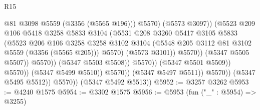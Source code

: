 \begin{lexlean}{R15}
\begin{coremodule}
                                                  @81
                                                  @3098
                                                  @5559
                                                  (@3356 (@5565 @196)))
                                                @5570)
                                              (@5573 @3097))
                                            (@5523
                                              @209
                                              @106
                                              @5418
                                              @3258
                                              @5833
                                              @3104
                                              (@5531
                                                @208
                                                @3260
                                                @5417
                                                @3105
                                                @5833
                                                (@5523
                                                  @206
                                                  @106
                                                  @3258
                                                  @3258
                                                  @3102
                                                  @3104
                                                  (@5548
                                                    @205
                                                    @3112
                                                    @81
                                                    @3102
                                                    @5559
                                                    (@3356 (@5565 @205)))
                                                  @5570)
                                                (@5573 @3101))
                                              @5570))
                                          (@5347 @5505 @5507))
                                        @5570))
                                    (@5347 @5503 @5508))
                                  @5570))
                              (@5347 @5501 @5509))
                            @5570))
                        (@5347 @5499 @5510))
                      @5570))
                  (@5347 @5497 @5511))
                @5570))
            (@5347 @5495 @5512))
          @5570))
      (@5347 @5492 @5513))
@5952 := @3257 @3262
@5953 := @4240 @1575
@5954 := @3302 @1575
@5956 := @5953 (fun ("_" : @5954) => @3255)

\end{coremodule}
\end{lexlean}
